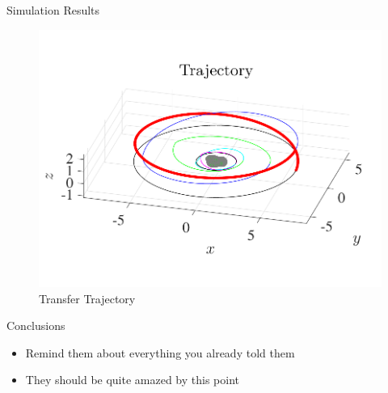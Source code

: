 \documentclass[final, usenames, dvipsnames]{beamer}
\newlength{\onecolwidth}
\begin{document}
\begin{frame}[t]
\begin{columns}[T,onlytextwidth]
\begin{column}{\onecolwidth}
\begin{block}{Simulation Results}
\begin{figure}[htbp]
    \end{figure}
    \begin{figure}[htbp] 
        \centering 
        \includegraphics[width=\columnwidth]{figures/trajectory_3d.pdf}
        \caption*{Transfer Trajectory}
    \end{figure}


\end{block} %

\begin{block}{Conclusions} %
	\begin{itemize}
		\item Remind them about everything you already told them
		\item They should be quite amazed by this point
	\end{itemize}
\end{block} %
\end{column}  %

\end{columns} %
\end{frame} %
\end{document}
